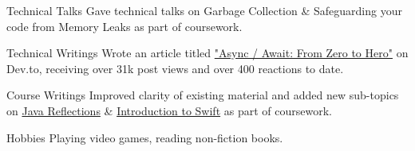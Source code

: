 


\begin{cvskills}


  \cvskill
  {Technical Talks}
  {Gave technical talks on Garbage Collection \& Safeguarding your code from Memory Leaks as part of coursework.}


  \cvskill
  {Technical Writings}
  {Wrote an article titled \href{https://github.com/se-edu/learningresources/pull/30}{"Async / Await: From Zero to Hero"} on Dev.to, receiving over 31k post views and over 400 reactions to date.}


  \cvskill
  {Course Writings}
  {Improved clarity of existing material and added new sub-topics on \href{https://github.com/se-edu/learningresources/pull/30}{Java Reflections} \& \href{https://github.com/se-edu/learningresources/pull/31}{Introduction to Swift} \linebreak as part of coursework.}


  \cvskill
  {Hobbies}
  {Playing video games, reading non-fiction books.}


\end{cvskills}